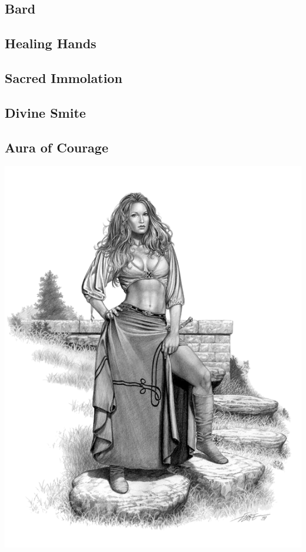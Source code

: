 
\begin{multicols*}{2}

\section{Bard}

\subsection*{Healing Hands}

\subsection*{Sacred Immolation}

\subsection*{Divine Smite}

\subsection*{Aura of Courage}

\begin{Figure}
\centering
\includegraphics[width=\textwidth]{img/bard-2.png}
\end{Figure}
    
\end{multicols*}

    